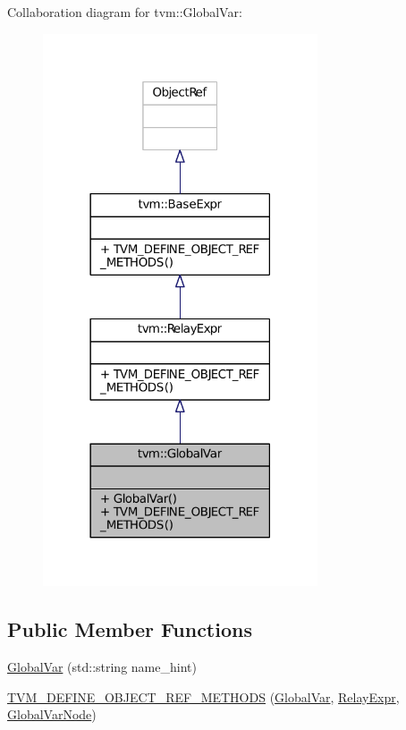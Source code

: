 Collaboration diagram for tvm\+:\+:Global\+Var\+:
\nopagebreak
\begin{figure}[H]
\begin{center}
\leavevmode
\includegraphics[width=230pt]{classtvm_1_1GlobalVar__coll__graph}
\end{center}
\end{figure}
\subsection*{Public Member Functions}
\begin{DoxyCompactItemize}
\item 
\hyperlink{classtvm_1_1GlobalVar_ad0f0f044c09b62de04bea9d09c5d82dc}{Global\+Var} (std\+::string name\+\_\+hint)
\item 
\hyperlink{classtvm_1_1GlobalVar_a86fb6dc85a2f435ec4c1fecd892be42d}{T\+V\+M\+\_\+\+D\+E\+F\+I\+N\+E\+\_\+\+O\+B\+J\+E\+C\+T\+\_\+\+R\+E\+F\+\_\+\+M\+E\+T\+H\+O\+DS} (\hyperlink{classtvm_1_1GlobalVar}{Global\+Var}, \hyperlink{classtvm_1_1RelayExpr}{Relay\+Expr}, \hyperlink{classtvm_1_1GlobalVarNode}{Global\+Var\+Node})
\end{DoxyCompactItemize}


